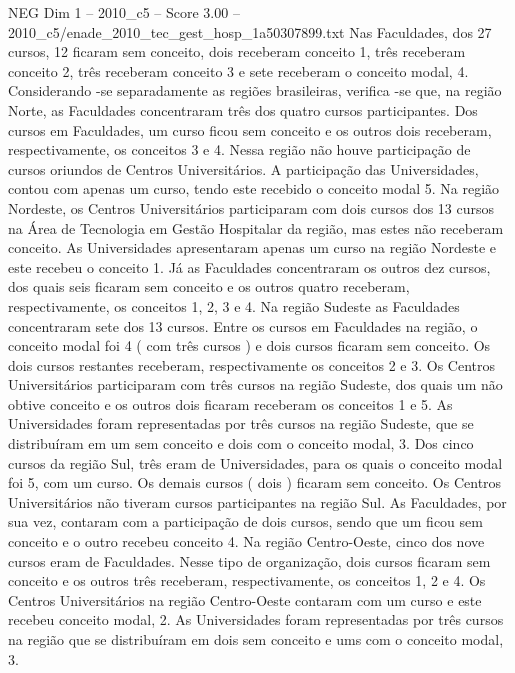 \begin{textsample}{NEG Dim 1 – 2010\_c5 – Score 3.00 – 2010\_c5/enade\_2010\_tec\_gest\_hosp\_1a50307899.txt}
Nas Faculdades, dos 27 cursos, 12 ficaram sem conceito, dois receberam conceito 1, três receberam conceito 2, três receberam conceito 3 e sete receberam o conceito modal, 4.
Considerando -se separadamente as regiões brasileiras, verifica -se que, na região Norte, as Faculdades concentraram três dos quatro cursos participantes.
Dos cursos em Faculdades, um curso ficou sem conceito e os outros dois receberam, respectivamente, os conceitos 3 e 4.
Nessa região não houve participação de cursos oriundos de Centros Universitários.
A participação das Universidades, contou com apenas um curso, tendo este recebido o conceito modal 5.
Na região Nordeste, os Centros Universitários participaram com dois cursos dos 13 cursos na Área de Tecnologia em Gestão Hospitalar da região, mas estes não receberam conceito.
As Universidades apresentaram apenas um curso na região Nordeste e este recebeu o conceito 1.
Já as Faculdades concentraram os outros dez cursos, dos quais seis ficaram sem conceito e os outros quatro receberam, respectivamente, os conceitos 1, 2, 3 e 4.
Na região Sudeste as Faculdades concentraram sete dos 13 cursos.
Entre os cursos em Faculdades na região, o conceito modal foi 4 ( com três cursos ) e dois cursos ficaram sem conceito.
Os dois cursos restantes receberam, respectivamente os conceitos 2 e 3.
Os Centros Universitários participaram com três cursos na região Sudeste, dos quais um não obtive conceito e os outros dois ficaram receberam os conceitos 1 e 5.
As Universidades foram representadas por três cursos na região Sudeste, que se distribuíram em um sem conceito e dois com o conceito modal, 3.
Dos cinco cursos da região Sul, três eram de Universidades, para os quais o conceito modal foi 5, com um curso.
Os demais cursos ( dois ) ficaram sem conceito.
Os Centros Universitários não tiveram cursos participantes na região Sul.
As Faculdades, por sua vez, contaram com a participação de dois cursos, sendo que um ficou sem conceito e o outro recebeu conceito 4.
Na região Centro-Oeste, cinco dos nove cursos eram de Faculdades.
Nesse tipo de organização, dois cursos ficaram sem conceito e os outros três receberam, respectivamente, os conceitos 1, 2 e 4.
Os Centros Universitários na região Centro-Oeste contaram com um curso e este recebeu conceito modal, 2.
As Universidades foram representadas por três cursos na região que se distribuíram em dois sem conceito e ums com o conceito modal, 3.

\end{textsample}
